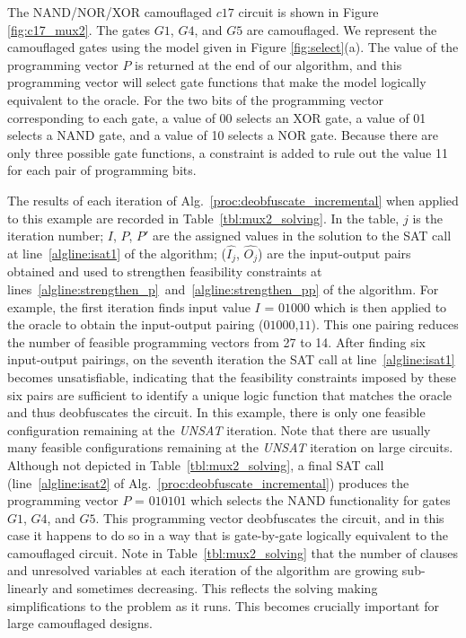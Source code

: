 \documentclass[proposal]{umassthesis}  %
\begin{document}
The NAND/NOR/XOR camouflaged $c17$ circuit is shown in Figure \ref{fig:c17_mux2}. The gates $G{1}$, $G{4}$, and $G{5}$ are camouflaged. We represent the camouflaged gates using the model given in Figure \ref{fig:select}(a). The value of the programming vector $P$ is returned at the end of our algorithm, and this programming vector will select gate functions that make the model logically equivalent to the oracle. For the two bits of the programming vector corresponding to each gate, a value of 00 selects an XOR gate, a value of 01 selects a NAND gate, and a value of 10 selects a NOR gate. Because there are only three possible gate functions, a constraint is added to rule out the value 11 for each pair of programming bits.

The results of each iteration of Alg.~\ref{proc:deobfuscate_incremental} when applied to this example are recorded in Table~\ref{tbl:mux2_solving}. In the table, $j$ is the iteration number; $I$, $P$, $P'$ are the assigned values in the solution to the SAT call at line~\ref{algline:isat1} of the algorithm; ($\hat{I_{j}}$, $\hat{O_{j}}$) are the input-output pairs obtained and used to strengthen feasibility constraints at lines~\ref{algline:strengthen_p}~and~\ref{algline:strengthen_pp} of the algorithm. For example, the first iteration finds input value $I$ = $01000$ which is then applied to the oracle to obtain the input-output pairing ($01000$,$11$). This one pairing reduces the number of feasible programming vectors from 27 to 14. After finding six input-output pairings, on the seventh iteration the SAT call at line~\ref{algline:isat1} becomes unsatisfiable, indicating that the feasibility constraints imposed by these six pairs are sufficient to identify a unique logic function that matches the oracle and thus deobfuscates the circuit. In this example, there is only one feasible configuration remaining at the \textit{UNSAT} iteration. Note that there are usually many feasible configurations remaining at the \textit{UNSAT} iteration on large circuits. Although not depicted in Table~\ref{tbl:mux2_solving}, a final SAT call (line~\ref{algline:isat2} of Alg.~\ref{proc:deobfuscate_incremental}) produces the programming vector $P$ = $010101$ which selects the NAND functionality for gates $G1$, $G4$, and $G5$. This programming vector deobfuscates the circuit, and in this case it happens to do so in a way that is gate-by-gate logically equivalent to the camouflaged circuit. Note in Table~\ref{tbl:mux2_solving} that the number of clauses and unresolved variables at each iteration of the algorithm are growing sub-linearly and sometimes decreasing. This reflects the solving making simplifications to the problem as it runs. This becomes crucially important for large camouflaged designs.
\end{document}

